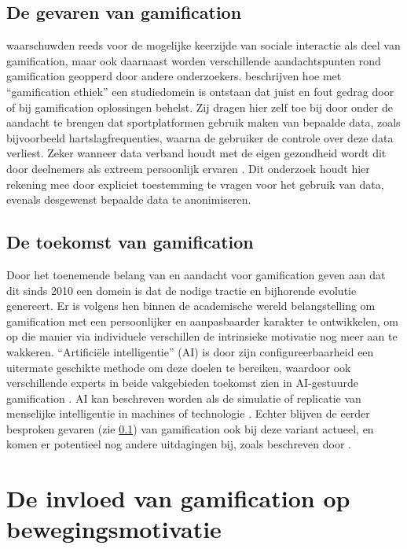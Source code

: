 \subsection{De gevaren van gamification}
\label{ssec:gevaren}

\textcite{Jong2010} waarschuwden reeds voor de mogelijke keerzijde van sociale interactie als deel van gamification, maar ook daarnaast worden verschillende aandachtspunten rond gamification geopperd door andere onderzoekers. \textcite{Hyrynsalmi2017} beschrijven hoe met “gamification ethiek” een studiedomein is ontstaan dat juist en fout gedrag door of bij gamification oplossingen behelst. Zij dragen hier zelf toe bij door onder de aandacht te brengen dat sportplatformen gebruik maken van bepaalde data, zoals bijvoorbeeld hartslagfrequenties, waarna de gebruiker de controle over deze data verliest. Zeker wanneer data verband houdt met de eigen gezondheid wordt dit door deelnemers als extreem persoonlijk ervaren \autocite{Hyrynsalmi2017}. Dit onderzoek houdt hier rekening mee door expliciet toestemming te vragen voor het gebruik van data, evenals desgewenst bepaalde data te anonimiseren.

\subsection{De toekomst van gamification}

Door het toenemende belang van en aandacht voor gamification geven \textcite{Bezzina2023} aan dat dit sinds 2010 een domein is dat de nodige tractie en bijhorende evolutie genereert. Er is volgens hen binnen de academische wereld belangstelling om gamification met een persoonlijker en aanpasbaarder karakter te ontwikkelen, om op die manier via individuele verschillen de intrinsieke motivatie nog meer aan te wakkeren. ``Artificiële intelligentie'' (AI) is door zijn configureerbaarheid een uitermate geschikte methode om deze doelen te bereiken, waardoor ook verschillende experts in beide vakgebieden toekomst zien in AI-gestuurde gamification \autocite{Bezzina2023}. AI kan beschreven worden als de simulatie of replicatie van menselijke intelligentie in machines of technologie \autocite{Stewart2020}. Echter blijven de eerder besproken gevaren (zie \ref{ssec:gevaren}) van gamification ook bij deze variant actueel, en komen er potentieel nog andere uitdagingen bij, zoals beschreven door \textcite{Saghiri2022}.

\section{De invloed van gamification op bewegingsmotivatie}

